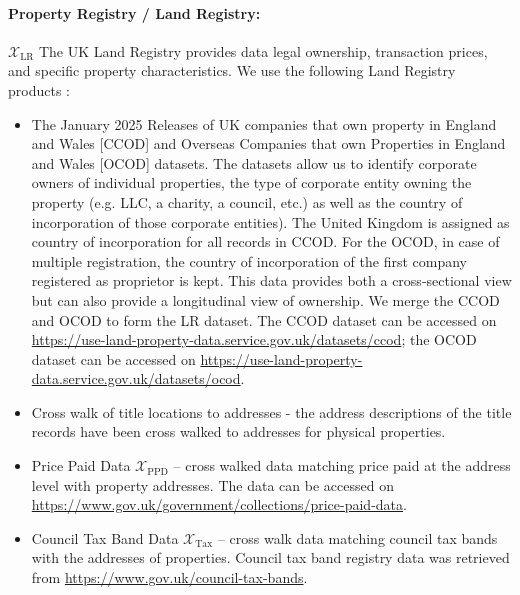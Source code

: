\documentclass[12pt]{article}
\begin{document}
\paragraph{Property Registry / Land Registry:} $\mathcal{X}_{\text{LR}}$ \quad The UK Land Registry provides data legal ownership, transaction prices, and specific property characteristics. We use the following Land Registry products :  
    \begin{itemize}
        \item The January 2025 Releases of UK companies that own property in England and Wales [CCOD] and Overseas Companies that own Properties in England and Wales [OCOD] datasets. The datasets allow us to identify corporate owners of individual properties, the type of corporate entity owning the property (e.g. LLC, a charity, a council, etc.) as well as the country of incorporation of those corporate entities). The United Kingdom is assigned as country of incorporation for all records in CCOD. For the OCOD, in case of multiple registration, the country of incorporation of the first company registered as proprietor is kept. This data provides both a cross-sectional view but can also provide a longitudinal view of ownership. We merge the CCOD and OCOD to form the LR dataset. The CCOD dataset can be accessed on \url{https://use-land-property-data.service.gov.uk/datasets/ccod}; the OCOD dataset can be accessed on \url{https://use-land-property-data.service.gov.uk/datasets/ocod}.
        \item Cross walk of title locations to addresses - the address descriptions of the title records have been cross walked to addresses for physical properties. 
        \item Price Paid Data $\mathcal{X}_{\text{PPD}}$ -- cross walked data matching price paid at the address level with property addresses. The data can be accessed on \url{https://www.gov.uk/government/collections/price-paid-data}.  
        \item Council Tax Band Data $\mathcal{X}_{\text{Tax}}$ -- cross walk data matching council tax bands with the addresses of properties. Council tax band registry data was retrieved from  \url{https://www.gov.uk/council-tax-bands}.
    \end{itemize}  %
\end{document}
